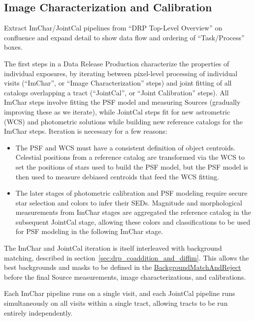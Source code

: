 \subsection{Image Characterization and Calibration}
\label{sec:drp_imchar_and_jointcal}

\begin{note}
Extract ImChar/JointCal pipelines from ``DRP Top-Level Overview'' on confluence and expand detail to show data flow and ordering of ``Task/Process'' boxes.
\end{note}

The first steps in a Data Release Production characterize the properties of individual exposures, by iterating between pixel-level processing of individual visits (``ImChar'', or ``Image Characterization'' steps) and joint fitting of all catalogs overlapping a tract (``JointCal'', or ``Joint Calibration'' steps).  All ImChar steps involve fitting the PSF model and measuring Sources (gradually improving these as we iterate), while JointCal steps fit for new astrometric (WCS) and photometric solutions while building new reference catalogs for the ImChar steps.  Iteration is necessary for a few reasons:
\begin{itemize}
\item The PSF and WCS must have a consistent definition of object centroids.  Celestial positions from a reference catalog are transformed via the WCS to set the positions of stars used to build the PSF model, but the PSF model is then used to measure debiased centroids that feed the WCS fitting.
\item The later stages of photometric calibration and PSF modeling require secure star selection and colors to infer their SEDs.  Magnitude and morphological measurements from ImChar stages are aggregated the reference catalog in the subsequent JointCal stage, allowing these colors and classifications to be used for PSF modeling in the following ImChar stage.
\end{itemize}

The ImChar and JointCal iteration is itself interleaved with background matching, described in section~\ref{sec:drp_coaddition_and_diffim}.  This allows the best backgrounds and masks to be defined in the \hyperref[drpBackgroundMatchAndReject]{BackgroundMatchAndReject} before the final Source measurements, image characterizations, and calibrations.

Each ImChar pipeline runs on a single visit, and each JointCal pipeline runs simultaneously on all visits within a single tract, allowing tracts to be run entirely independently.

